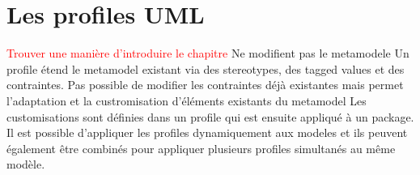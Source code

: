 \chapter{Les profiles UML}
\textcolor{red}{Trouver une manière d'introduire le chapitre}
Ne modifient pas le metamodele
Un profile étend le metamodel existant via des stereotypes, des tagged values et des contraintes.
Pas possible de modifier les contraintes déjà existantes mais permet l'adaptation et la custromisation d'éléments existants du metamodel
Les customisations sont définies dans un profile qui est ensuite appliqué à un package.
Il est possible d'appliquer les profiles dynamiquement aux modeles et ils peuvent également être combinés pour appliquer plusieurs profiles simultanés au même modèle.